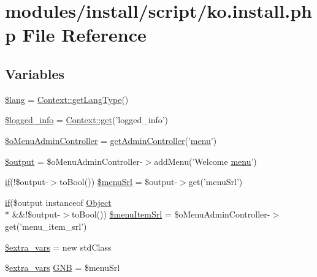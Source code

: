 \hypertarget{ko_8install_8php}{\section{modules/install/script/ko.install.\+php File Reference}
\label{ko_8install_8php}
}
\subsection*{Variables}
\begin{DoxyCompactItemize}
\item 
\hyperlink{ko_8install_8php_a7714b111b644017933931ec69a154102}{\$lang} = \hyperlink{classContext_ae75d6f4064d09e48d0d76614b6997e29}{Context\+::get\+Lang\+Type}()
\item 
\hyperlink{ko_8install_8php_a193c1593ceb216e9fb05b0bad01ebbc8}{\$logged\+\_\+info} = \hyperlink{classContext_a90ce25d65fe6c9778421cbb36ab3def5}{Context\+::get}('logged\+\_\+info')
\item 
\hyperlink{ko_8install_8php_a9062530c3b03479ca4530daee1c18887}{\$o\+Menu\+Admin\+Controller} = \hyperlink{func_8inc_8php_a2f7ca88a5226536aca3b2f5682bd7b2d}{get\+Admin\+Controller}('\hyperlink{classmenu}{menu}')
\item 
\hyperlink{ko_8install_8php_a73004ce9cd673c1bfafd1dc351134797}{\$output} = \$o\+Menu\+Admin\+Controller-\/$>$add\+Menu('Welcome \hyperlink{classmenu}{menu}')
\item 
\hyperlink{point__level__icon_8addon_8php_a29031816e50a8f742422e671b2bef9b2}{if}(!\$output-\/$>$to\+Bool()) \hyperlink{ko_8install_8php_abb9a711d32f19d7aff02c8501ad6fb55}{\$menu\+Srl} = \$output-\/$>$get('menu\+Srl')
\item 
\hyperlink{point__level__icon_8addon_8php_a29031816e50a8f742422e671b2bef9b2}{if}(\$output instanceof \hyperlink{classObject}{Object} \\*
\&\&!\$output-\/$>$to\+Bool()) \hyperlink{ko_8install_8php_a874928b6d7b44487718f1ede4a9f6ffe}{\$menu\+Item\+Srl} = \$o\+Menu\+Admin\+Controller-\/$>$get('menu\+\_\+item\+\_\+srl')
\item 
\hyperlink{ko_8install_8php_ae9f3d13d48d464400201d7ec024d3a45}{\$extra\+\_\+vars} = new std\+Class
\item 
\$\hyperlink{ko_8install_8php_ae1dcb37fc34a8f312d2e6abd6f806743}{extra\+\_\+vars} \hyperlink{ko_8install_8php_a9b1716b68fc04f3492448f38148dcbf5}{G\+N\+B} = \$menu\+Srl
\item 

\end{DoxyCompactItemize}

